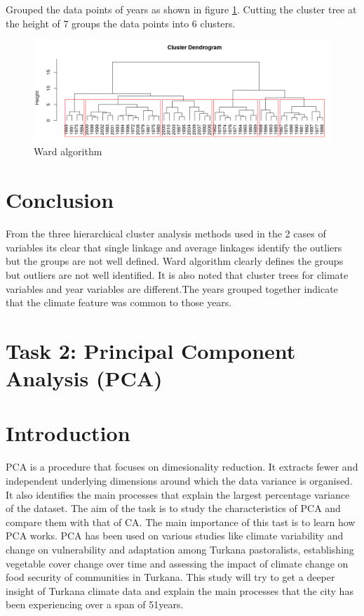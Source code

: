 \documentclass[12pt,a4paper]{article}
\begin{document}
\begin{enumerate}[label=\roman*)]
\noindent Grouped the data points of years as shown in figure \ref{fig:w2}.
Cutting the cluster tree at the height of 7 groups the data points into 6 clusters.

\begin{figure}[h]
	\centering
	\includegraphics[width=0.7\linewidth]{w2}
	\caption{Ward algorithm}
	\label{fig:w2}
\end{figure}

\section{Conclusion}
\noindent From the three hierarchical cluster analysis methods used in the 2 cases of variables its clear that single linkage and average linkages identify the outliers but the groups are not well defined. Ward algorithm clearly defines the groups but outliers are not well identified. It is also noted that cluster trees for climate variables and year variables are different.The years grouped together indicate that the climate feature was common to those years.
\end{enumerate}

\section{Task 2: Principal Component Analysis (PCA)}
\section{Introduction}

PCA is a procedure that focuses on dimesionality reduction. It extracts fewer and independent underlying dimensions around which the data variance is organised. It also identifies the main processes that explain the largest percentage variance of the dataset. The aim of the task is to study the characteristics of PCA and compare them with that of CA. The main importance of this tast is to learn how PCA works.  PCA has been used on various studies like climate variability and change on vulnerability and adaptation among Turkana pastoralists, establishing vegetable cover change over time and assessing the impact of climate change on food security of communities in Turkana. This study will try to get a deeper insight of Turkana climate data and explain the main processes that the city has been experiencing over a span of 51years.
\end{document}
